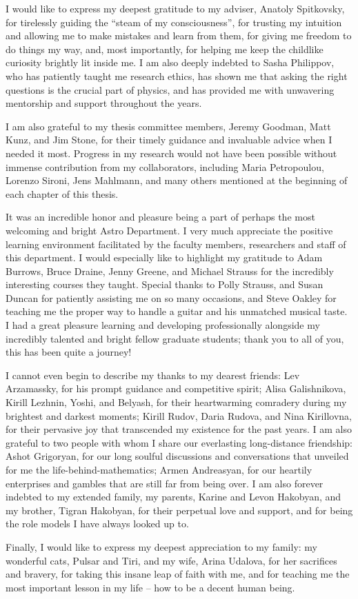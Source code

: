 
 I would like to express my deepest gratitude to my adviser, Anatoly Spitkovsky, for tirelessly guiding the ``steam of my consciousness'', for trusting my intuition and allowing me to make mistakes and learn from them, for giving me freedom to do things my way, and, most importantly, for helping me keep the childlike curiosity brightly lit inside me. I am also deeply indebted to Sasha Philippov, who has patiently taught me research ethics, has shown me that asking the right questions is the crucial part of physics, and has provided me with unwavering mentorship and support throughout the years. 

I am also grateful to my thesis committee members, Jeremy Goodman, Matt Kunz, and Jim Stone, for their timely guidance and invaluable advice when I needed it most. Progress in my research would not have been possible without immense contribution from my collaborators, including Maria Petropoulou, Lorenzo Sironi, Jens Mahlmann, and many others mentioned at the beginning of each chapter of this thesis. 

It was an incredible honor and pleasure being a part of perhaps the most welcoming and bright Astro Department. I very much appreciate the positive learning environment facilitated by the faculty members, researchers and staff of this department. I would especially like to highlight my gratitude to Adam Burrows, Bruce Draine, Jenny Greene, and Michael Strauss for the incredibly interesting courses they taught. Special thanks to Polly Strauss, and Susan Duncan for patiently assisting me on so many occasions, and Steve Oakley for teaching me the proper way to handle a guitar and his unmatched musical taste. I had a great pleasure learning and developing professionally alongside my incredibly talented and bright fellow graduate students; thank you to all of you, this has been quite a journey!

I cannot even begin to describe my thanks to my dearest friends: Lev Arzamassky, for his prompt guidance and competitive spirit; Alisa Galishnikova, Kirill Lezhnin, Yoshi, and Belyash, for their heartwarming comradery during my brightest and darkest moments; Kirill Rudov, Daria Rudova, and Nina Kirillovna, for their pervasive joy that transcended my existence for the past years. I am also grateful to two people with whom I share our everlasting long-distance friendship: Ashot Grigoryan, for our long soulful discussions and conversations that unveiled for me the life-behind-mathematics; Armen Andreasyan, for our heartily enterprises and gambles that are still far from being over. I am also forever indebted to my extended family, my parents, Karine and Levon Hakobyan, and my brother, Tigran Hakobyan, for their perpetual love and support, and for being the role models I have always looked up to. 

Finally, I would like to express my deepest appreciation to my family: my wonderful cats, Pulsar and Tiri, and my wife, Arina Udalova, for her sacrifices and bravery, for taking this insane leap of faith with me, and for teaching me the most important lesson in my life -- how to be a decent human being.

